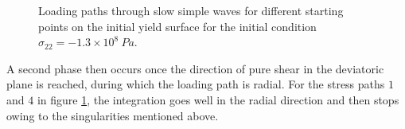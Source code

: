 \begin{figure}[h!]
  \centering
  \caption{Loading paths through slow simple waves for different starting points on the initial yield surface for the initial condition $\sigma_{22}=-1.3 \times 10^{8} \: Pa$.}
  \label{fig:slow_path_plane_strains1}
\end{figure}
A second phase then occurs once the direction of pure shear in the deviatoric plane is reached, during which the loading path is radial.
For the stress paths $1$ and $4$ in figure \ref{fig:slow_path_plane_strains1}, the integration goes well in the radial direction and then stops owing to the singularities mentioned above.

